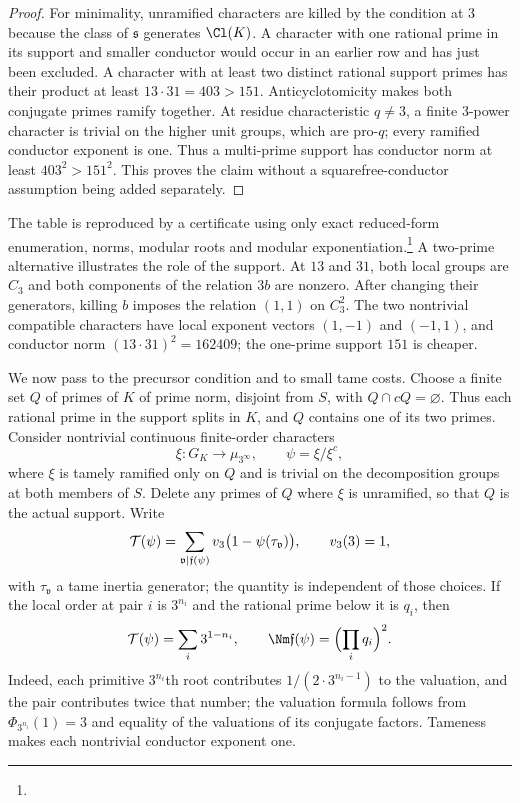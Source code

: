 \begin{proof}
For minimality, unramified characters are killed by the condition at $3$
because the class of $\mathfrak s$ generates $\Cl(K)$. A character with one
rational prime in its support and smaller conductor would occur in an earlier
row and has just been excluded. A character with at least two distinct
rational support primes has their product at least $13\cdot31=403>151$.
Anticyclotomicity makes both conjugate primes ramify together. At residue
characteristic $q\ne3$, a finite $3$-power character is trivial on the higher
unit groups, which are pro-$q$; every ramified conductor exponent is one.
Thus a multi-prime support has conductor norm at least $403^2>151^2$. This
proves the claim without a squarefree-conductor assumption being added
separately.
\end{proof}

The table is reproduced by a certificate using only exact reduced-form
enumeration, norms, modular roots and modular
exponentiation.\footnote{}
A two-prime alternative illustrates the role of the support. At $13$ and
$31$, both local groups are $C_3$ and both components of the relation $3b$
are nonzero. After changing their generators, killing $b$ imposes the
relation $(1,1)$ on $C_3^2$. The two nontrivial compatible characters have
local exponent vectors $(1,-1)$ and $(-1,1)$, and conductor norm
$(13\cdot31)^2=162409$; the one-prime support $151$ is cheaper.

\medskip
We now pass to the precursor condition and to small tame costs. Choose a
finite set $Q$ of primes of $K$ of prime norm, disjoint from $S$, with
$Q\cap cQ=\varnothing$. Thus each rational prime in the support splits in
$K$, and $Q$ contains one of its two primes. Consider nontrivial continuous
finite-order characters
\[
 \xi\colon G_K\longrightarrow\mu_{3^\infty},\qquad\psi=\xi/\xi^c,
\]
where $\xi$ is tamely ramified only on $Q$ and is trivial on the
decomposition groups at both members of $S$. Delete any primes of $Q$ where
$\xi$ is unramified, so that $Q$ is the actual support. Write
\begin{equation}\label{spn:eq:tame-cost-def}
 \mathcal{T}(\psi)=\sum_{\mathfrak v\mid\mathfrak f(\psi)}
 v_3\bigl(1-\psi(\tau_{\mathfrak v})\bigr),\qquad v_3(3)=1,
\end{equation}
with $\tau_{\mathfrak v}$ a tame inertia generator; the quantity is
independent of those choices. If the local order at pair $i$ is $3^{n_i}$ and
the rational prime below it is $q_i$, then
\begin{equation}\label{spn:eq:source-twist-cost}
 \spnTame(\psi)=\sum_i3^{1-n_i},\qquad
 \Nm\mathfrak f(\psi)=\Bigl(\prod_iq_i\Bigr)^2 .
\end{equation}
Indeed, each primitive $3^{n_i}$th root contributes $1/(2\cdot3^{n_i-1})$ to
the valuation, and the pair contributes twice that number; the valuation
formula follows from $\Phi_{3^{n_i}}(1)=3$ and equality of the valuations of
its conjugate factors. Tameness makes each nontrivial conductor exponent
one.

